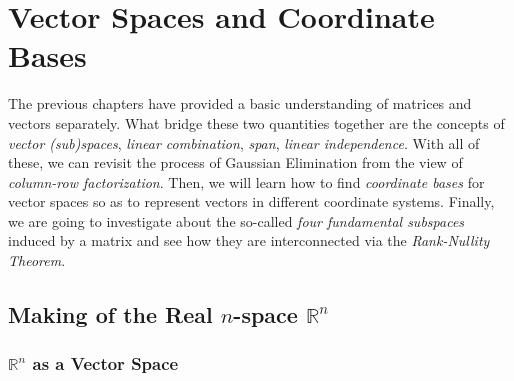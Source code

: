 \chapter{Vector Spaces and Coordinate Bases}
\label{chap:vec_space}

The previous chapters have provided a basic understanding of matrices and vectors separately. What bridge these two quantities together are the concepts of \textit{vector (sub)spaces}, \textit{linear combination}, \textit{span}, \textit{linear independence}. With all of these, we can revisit the process of Gaussian Elimination from the view of \textit{column-row factorization}. Then, we will learn how to find \textit{coordinate bases} for vector spaces so as to represent vectors in different coordinate systems. Finally, we are going to investigate about the so-called \textit{four fundamental subspaces} induced by a matrix and see how they are interconnected via the \textit{Rank-Nullity Theorem}.

\section{Making of the Real $n$-space $\mathbb{R}^n$}

\subsection{$\mathbb{R}^n$ as a Vector Space}


